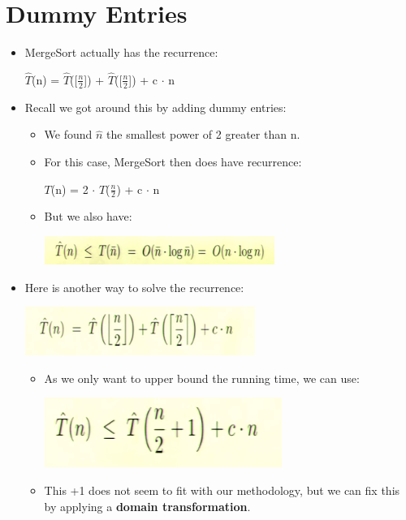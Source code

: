 \documentclass[12pt]{article}
\begin{document}
\section{Dummy Entries}
\begin{itemize}
\item MergeSort actually has the recurrence:
	\begin{center}
	\large{$\hat{T}$(n) = $\hat{T}$([$\frac{n}{2}$]) + $\hat{T}$([$\frac{n}{2}$]) + c $\cdot$ n}
	\end{center}
\item Recall we got around this by adding dummy entries:
	\begin{itemize}
	\item We found $\hat{n}$ the smallest power of 2 greater than n.
	\item For this case, MergeSort then does have recurrence:
		\begin{center}
		\large{$T$(n) = 2 $\cdot$ $T$($\frac{n}{2}$) + c $\cdot$ n}
		\end{center}
	\item But we also have: 
		\begin{center}
		\includegraphics{lecture2j}
		\end{center}
	\end{itemize}
\item Here is another way to solve the recurrence:
	\begin{center}
	\includegraphics{lecture2h}
	\end{center}
	\begin{itemize}
	\item As we only want to upper bound the running time, we can use:
	\begin{center}
	\includegraphics{lecture2k}
	\end{center}
	\item This +1 does not seem to fit with our methodology, but we can fix this by applying a 			\textbf{domain transformation}.

\end{itemize}
\end{itemize}
\end{document}
